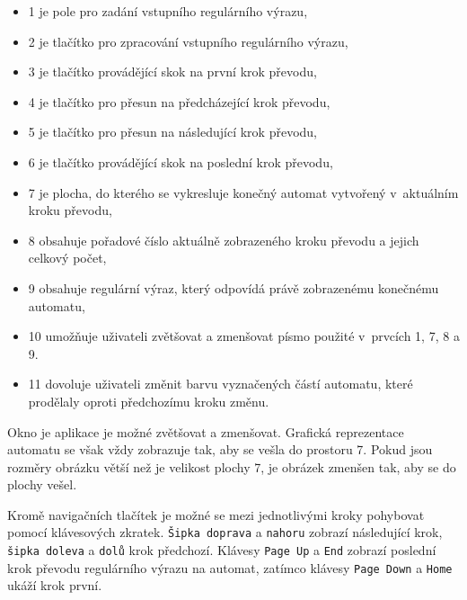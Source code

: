 \documentclass[10pt, notitlepage]{article}
\begin{document}
\begin{itemize}
	\item 1 je pole pro zadání vstupního regulárního výrazu,

	\item 2 je tlačítko pro zpracování vstupního regulárního výrazu,

	\item 3 je tlačítko provádějící skok na první krok převodu,

	\item 4 je tlačítko pro přesun na předcházející krok převodu,

	\item 5 je tlačítko pro přesun na následující krok převodu,

	\item 6 je tlačítko provádějící skok na poslední krok převodu,

	\item 7 je plocha, do kterého se vykresluje konečný automat vytvořený
		v~aktuálním kroku převodu,

	\item 8 obsahuje pořadové číslo aktuálně zobrazeného kroku převodu a jejich
		celkový počet,

	\item 9 obsahuje regulární výraz, který odpovídá právě zobrazenému
		konečnému automatu,

	\item 10 umožňuje uživateli zvětšovat a zmenšovat písmo použité v~prvcích
		1, 7, 8 a 9.

	\item 11 dovoluje uživateli změnit barvu vyznačených částí automatu, které
		prodělaly oproti předchozímu kroku změnu.

\end{itemize}

Okno je aplikace je možné zvětšovat a zmenšovat. Grafická reprezentace automatu
se však vždy zobrazuje tak, aby se vešla do prostoru 7. Pokud jsou rozměry
obrázku větší než je velikost plochy 7, je obrázek zmenšen tak, aby se do plochy
vešel.

Kromě navigačních tlačítek je možné se mezi jednotlivými kroky pohybovat pomocí
klávesových zkratek. \texttt{Šipka doprava} a \texttt{nahoru} zobrazí
následující krok, \texttt{šipka doleva} a \texttt{dolů} krok předchozí. Klávesy
\texttt{Page Up} a \texttt{End} zobrazí poslední krok převodu regulárního výrazu
na automat, zatímco klávesy \texttt{Page Down} a \texttt{Home} ukáží krok první.
\end{document}

